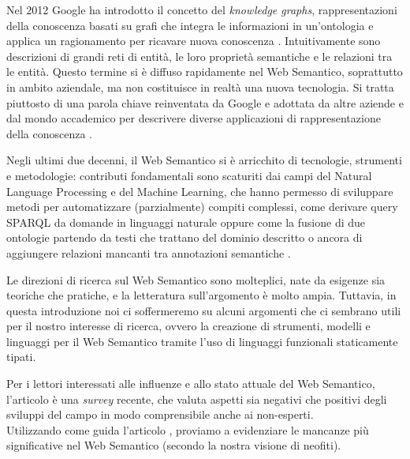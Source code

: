 Nel 2012 Google ha introdotto il concetto del \emph{knowledge graphs}, rappresentazioni della conoscenza basati su grafi che integra le informazioni in un'ontologia e applica un ragionamento per ricavare nuova conoscenza \cite{ehrlinger2016towards}. Intuitivamente sono descrizioni di grandi reti di entità, le loro proprietà semantiche e le relazioni tra le entità. Questo termine si è diffuso rapidamente nel Web Semantico, soprattutto in ambito aziendale, ma non costituisce in realtà una nuova tecnologia. Si tratta piuttosto di una parola chiave reinventata da Google e adottata da altre aziende e dal mondo accademico per descrivere diverse applicazioni di rappresentazione della conoscenza \cite{ehrlinger2016towards, hitzler2021review}.

Negli ultimi due decenni, il Web Semantico si è arricchito di tecnologie, strumenti e metodologie: contributi fondamentali sono scaturiti dai campi del Natural Language Processing e del Machine Learning, che hanno permesso di sviluppare metodi per automatizzare (parzialmente) compiti complessi, come derivare query SPARQL da domande in linguaggi naturale \cite{Evseev2020SPARQLQG, Zlatareva2021ProcessingNL, Hu2021NaturalLQ} oppure come la fusione di due ontologie partendo da testi che trattano del dominio descritto \cite{caldarolaMultiStrategyApproach} o ancora di aggiungere relazioni mancanti tra annotazioni semantiche \cite{discoveringmissingsemanticrelation, repairinghiddenlinks}. 

Le direzioni di ricerca sul Web Semantico sono molteplici, nate da esigenze sia teoriche che pratiche, e la letteratura sull'argomento è molto ampia. Tuttavia, in questa introduzione noi ci soffermeremo su alcuni argomenti che ci sembrano utili per il nostro interesse di ricerca, ovvero la creazione di strumenti, modelli e linguaggi per il Web Semantico tramite l'uso di linguaggi funzionali staticamente tipati.

Per i lettori interessati alle influenze e allo stato attuale del Web Semantico, l'articolo \cite{hitzler2021review} è una \emph{survey} recente, che valuta aspetti sia negativi che positivi degli sviluppi del campo in modo comprensibile anche ai non-esperti.\\
Utilizzando come guida l'articolo \cite{hitzler2021review}, proviamo a evidenziare le mancanze più significative nel Web Semantico (secondo la nostra visione di neofiti).

